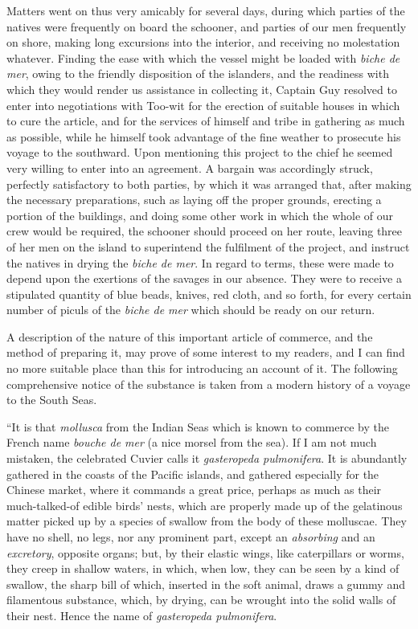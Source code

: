 Matters went on thus very amicably for several days, during which parties of
the natives were frequently on board the schooner, and parties of our men
frequently on shore, making long excursions into the interior, and receiving no
molestation whatever. Finding the ease with which the vessel might be loaded
with \emph{biche de mer}, owing to the friendly disposition of the islanders,
and the readiness with which they would render us assistance in collecting it,
Captain Guy resolved to enter into negotiations with Too-wit for the erection of
suitable houses in which to cure the article, and for the services of himself
and tribe in gathering as much as possible, while he himself took advantage of
the fine weather to prosecute his voyage to the southward. Upon mentioning this
project to the chief he seemed very willing to enter into an agreement. A
bargain was accordingly struck, perfectly satisfactory to both parties, by which
it was arranged that, after making the necessary preparations, such as laying
off the proper grounds, erecting a portion of the buildings, and doing some
other work in which the whole of our crew would be required, the schooner should
proceed on her route, leaving three of her men on the island to superintend the
fulfilment of the project, and instruct the natives in drying the \emph{biche de
mer}. In regard to terms, these were made to depend upon the exertions of the
savages in our absence. They were to receive a stipulated quantity of blue
beads, knives, red cloth, and so forth, for every certain number of piculs of
the \emph{biche de mer} which should be ready on our return. 

A description of the nature of this important article of commerce, and the
method of preparing it, may prove of some interest to my readers, and I can find
no more suitable place than this for introducing an account of it. The following
comprehensive notice of the substance is taken from a modern history of a voyage
to the South Seas. 

``It is that \emph{mollusca} from the Indian Seas which is known to commerce
by the French name \emph{bouche de mer} (a nice morsel from the sea). If I am
not much mistaken, the celebrated Cuvier calls it \emph{gasteropeda
pulmonifera}. It is abundantly gathered in the coasts of the Pacific islands,
and gathered especially for the Chinese market, where it commands a great price,
perhaps as much as their much-talked-of edible birds' nests, which are properly
made up of the gelatinous matter picked up by a species of swallow from the body
of these molluscae. They have no shell, no legs, nor any prominent part, except
an \emph{absorbing} and an \emph{excretory}, opposite organs; but, by their
elastic wings, like caterpillars or worms, they creep in shallow waters, in
which, when low, they can be seen by a kind of swallow, the sharp bill of which,
inserted in the soft animal, draws a gummy and filamentous substance, which, by
drying, can be wrought into the solid walls of their nest. Hence the name of
\emph{gasteropeda pulmonifera}. 

